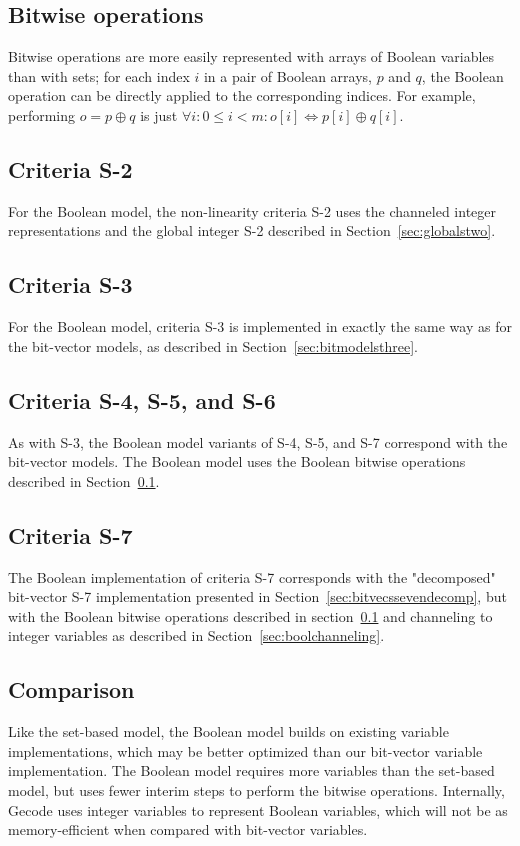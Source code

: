\documentclass[a4paper,10pt,twoside,openright]{book}
\begin{document}
\subsection{Bitwise operations}
\label{sec:boolbitwise}
Bitwise operations are more easily represented with arrays of Boolean variables than with sets; 
for each index $i$ in a pair of Boolean arrays, $p$ and $q$,
the Boolean operation can be directly applied to the corresponding indices.
For example, performing $o = p \oplus q$ is just $\forall i : 0 \leq i < m : o[i] \Leftrightarrow p[i] \oplus q[i]$.

\subsection{Criteria S-2}
For the Boolean model, the non-linearity criteria S-2 uses the channeled integer representations 
and the global integer S-2 described in Section~\ref{sec:globalstwo}.

\subsection{Criteria S-3}
For the Boolean model, criteria S-3 is implemented in exactly the same way as for the 
bit-vector models, as described in Section~\ref{sec:bitmodelsthree}.

\subsection{Criteria S-4, S-5, and S-6}
As with S-3, the Boolean model variants of S-4, S-5, and S-7 correspond with the bit-vector models. 
The Boolean model uses the Boolean bitwise operations described in Section~\ref{sec:boolbitwise}.

\subsection{Criteria S-7}
The Boolean implementation of criteria S-7 corresponds with the "decomposed" bit-vector S-7
implementation presented in Section~\ref{sec:bitvecssevendecomp}, but with
the Boolean bitwise operations described in
section~\ref{sec:boolbitwise} and channeling to integer variables as 
described in Section~\ref{sec:boolchanneling}.

\subsection{Comparison}
Like the set-based model, the Boolean model builds on existing variable implementations,
which may be better optimized than our bit-vector variable implementation.
The Boolean model requires more variables than the set-based model, 
but uses fewer interim steps to perform the bitwise operations.
Internally, Gecode uses integer variables to represent Boolean variables,
which will not be as memory-efficient when compared with bit-vector variables.
\end{document}
